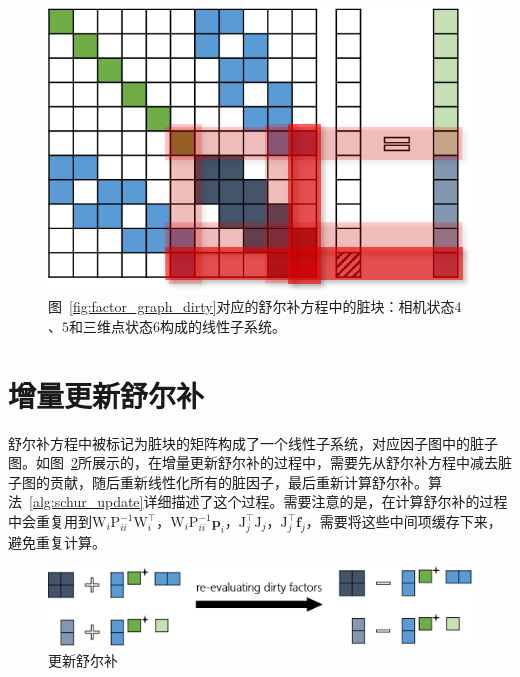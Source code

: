 

\begin{figure}[htb!]
    \centering
    \includegraphics[scale=1]{Pictures/normal_eq_dirty.png}
    \caption{图~\ref{fig:factor_graph_dirty}对应的舒尔补方程中的脏块：相机状态$4$、$5$和三维点状态$6$构成的线性子系统。}
    \label{fig:normal_eq_dirty}
\end{figure}

\section{增量更新舒尔补}

舒尔补方程中被标记为脏块的矩阵构成了一个线性子系统，对应因子图中的脏子图。如图~\ref{fig:schur_update}所展示的，在增量更新舒尔补的过程中，需要先从舒尔补方程中减去脏子图的贡献，随后重新线性化所有的脏因子，最后重新计算舒尔补。算法~\ref{alg:schur_update}详细描述了这个过程。需要注意的是，在计算舒尔补的过程中会重复用到$\mathrm{W}_i\mathrm{P}_{ii}^{-1}\mathrm{W}_i^\top$，$\mathrm{W}_i\mathrm{P}_{ii}^{-1}\bm{p}_i$，$\mathrm{J}_j^\top\mathrm{J}_j$，$\mathrm{J}_j^\top\bm{f}_j$，需要将这些中间项缓存下来，避免重复计算。



\begin{figure}[htb!]
    \centering
    \includegraphics[width=\textwidth]{Pictures/schur_update.png}
    \caption{更新舒尔补}
    \label{fig:schur_update}
\end{figure}

